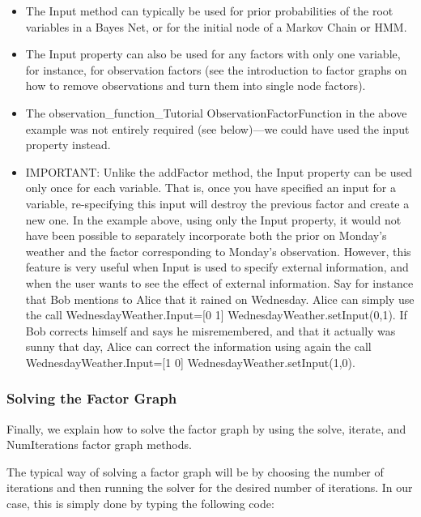 \begin{itemize}
\item The Input method can typically be used for prior probabilities of the root variables in a Bayes Net, or for the initial node of a Markov Chain or HMM.
\item The Input property can also be used for any factors with only one variable, for instance, for observation factors (see the introduction to factor graphs on how to remove observations and turn them into single node factors).
\item The \ifmatlab observation\_function\_Tutorial \fi \ifjava ObservationFactorFunction \fi in the above example was not entirely required (see below)---we could have used the input property instead.
\item IMPORTANT: Unlike the addFactor method, the Input property can be used only once for each variable. That is, once you have specified an input for a variable, re-specifying this input will destroy the previous factor and create a new one. In the example above, using only the Input property, it would not have been possible to separately incorporate both the prior on Monday's weather and the factor corresponding to Monday's observation. However, this feature is very useful when Input is used to specify external information, and when the user wants to see the effect of external information. Say for instance that Bob mentions to Alice that it rained on Wednesday. Alice can simply use the call \ifmatlab WednesdayWeather.Input=[0 1] \fi \ifjava WednesdayWeather.setInput(0,1)\fi. If Bob corrects himself and says he misremembered, and that it actually was sunny that day, Alice can correct the information using again the call \ifmatlab WednesdayWeather.Input=[1 0] \fi \ifjava WednesdayWeather.setInput(1,0)\fi.
\end{itemize}


\subsubsection*{Solving the Factor Graph}

Finally, we explain how to solve the factor graph by using the solve, iterate, and NumIterations factor graph methods.

The typical way of solving a factor graph will be by choosing the number of iterations and then running the solver for the desired number of iterations. In our case, this is simply done by typing the following code:

\ifmatlab

